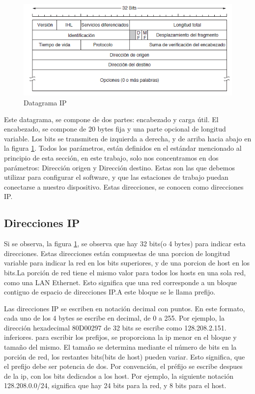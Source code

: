 \begin{figure}[ht]
	\centering
	\includegraphics{parte_2/redes/datagip}
	\caption{Datagrama IP}
	\label{fig:datIP}
\end{figure} 
Este datagrama, se compone de dos partes: encabezado y carga útil. El encabezado, se compone de 20 bytes fija y una parte opcional de longitud variable. Los bits se transmiten de izquierda a derecha, y de arriba hacia abajo en la figura \ref{fig:datIP}. Todos los parámetros, están definidos en el estándar mencionado al principio de esta sección, en este trabajo, solo nos concentramos en dos parámetros: Dirección origen y Dirección destino. Estas son las que debemos utilizar para configurar el software, y que las estaciones de trabajo puedan conectarse a nuestro dispositivo. Estas direcciones, se conocen como direcciones IP. 
\subsection{Direcciones IP} 
Si se observa, la figura \ref{fig:datIP}, se observa que hay 32 bits(o 4 bytes) para indicar esta direcciones. Estas direcciones están compuestas de una porcion de longitud variable para indicar la red en los bits superiores, y de una porcion de host en los bits.La porción de red tiene el mismo valor para todos los hosts en una sola red, como una LAN Ethernet. Esto significa que una red corresponde a un bloque contiguo de espacio de direcciones IP.A este bloque se le llama prefijo. 

Las direcciones IP se escriben en notación decimal con puntos. En este formato, cada uno de los 4 bytes se escribe en decimal, de 0 a 255. Por ejemplo, la dirección hexadecimal 80D00297 de 32 bits se escribe como 128.208.2.151.  
inferiores. para escribir los prefijos, se proporciona la ip menor en el bloque y tamaño del mismo. El tamaño se determina mediante el número de bits en la porción de red, los restantes bits(bits de host) pueden variar. Esto significa, que el prefijo debe ser potencia de dos. Por convención, el préfijo se escribe despues de la ip, con los bits dedicados a los host. Por ejemplo, la siguiente notación 128.208.0.0/24, significa que hay 24 bits para la red, y 8 bits para el host. 

